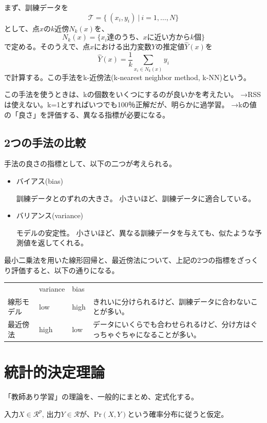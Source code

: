\documentclass{jsarticle}
\begin{document}
まず、訓練データを
\[
  \mathcal{T}=\{ \ (x_i,y_i) \ | \ i=1,\dots,N\}
\]
として、点$x$の$k$近傍$N_k(x)$を、
\[
  N_k(x)=\{x_i\mbox{達のうち、}x\mbox{に近い方から}k\mbox{個}\}
\]
で定める。そのうえで、点$x$における出力変数$Y$の推定値$\hat{Y}(x)$を
\[
  \hat{Y}(x)=\frac{1}{k}\sum_{x_i \in N_k(x)}y_i
\]
で計算する。この手法をk-近傍法(k-nearest neighbor method, k-NN)という。

この手法を使うときは、kの個数をいくつにするのが良いかを考えたい。
→RSSは使えない。k=1とすればいつでも100％正解だが、明らかに過学習。
→kの値の「良さ」を評価する、異なる指標が必要になる。

\subsection{2つの手法の比較}
手法の良さの指標として、以下の二つが考えられる。
\begin{itemize}
  \item バイアス(bias)

  訓練データとのずれの大きさ。
  小さいほど、訓練データに適合している。

  \item バリアンス(variance)

  モデルの安定性。
  小さいほど、異なる訓練データを与えても、似たような予測値を返してくれる。
\end{itemize}

最小二乗法を用いた線形回帰と、最近傍法について、上記の2つの指標をざっくり評価すると、以下の通りになる。

\begin{table}[h]
  \begin{tabular}{llll}
    \ & variance & bias & \ \\
    線形モデル & low & high & きれいに分けられるけど、訓練データに合わないことが多い。\\
    最近傍法 & high & low & データにいくらでも合わせられるけど、分け方はぐっちゃぐちゃになることが多い。
  \end{tabular}
\end{table}


\section{統計的決定理論}

「教師あり学習」の理論を、一般的にまとめ、定式化する。

入力$X \in \mathcal{R}^p$, 出力$Y \in \mathcal{R}$が、$\mathrm{Pr}(X, Y)$という確率分布に従うと仮定。
\end{document}
